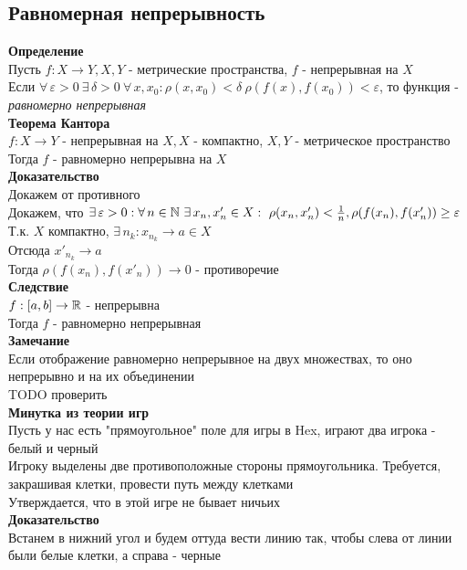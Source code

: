 \documentclass[12pt]{article}
\begin{document}
\subsection{Равномерная непрерывность}
\textbf{Определение}\\
Пусть $f: X \rightarrow Y, X, Y$ - метрические пространства, $f$ - непрерывная на $X$\\
Если $\forall\,\varepsilon > 0\ \exists\,\delta > 0\ \forall\,x,x_0: \rho(x, x_0) < \delta\ \rho(f(x), f(x_0)) < \varepsilon$, то функция - \textit{равномерно непрерывная}\\
\textbf{Теорема Кантора}\\
$f: X \rightarrow Y$ - непрерывная на $X, X$ - компактно, $X, Y$ - метрическое пространство\\
Тогда $f$ - равномерно непрерывна на $X$\\
\textbf{Доказательство}\\
Докажем от противного\\
Докажем, что $\exists\,\varepsilon > 0: \forall\,n \in \mathbb{N}\ \exists\,x_n, x'_n \in X:\ \rho(x_n, x'_n) < \frac{1}{n}, \rho(f(x_n), f(x'_n)) \geq \varepsilon$\\
Т.к. $X$ компактно, $\exists\,n_k: x_{n_k} \rightarrow a \in X$\\
Отсюда $x'_{n_k} \rightarrow a$\\
Тогда $\rho(f(x_n), f(x'_n)) \rightarrow 0$ - противоречие\\
\textbf{Следствие}\\
$f:[a,b]\rightarrow \mathbb{R}$ - непрерывна\\
Тогда $f$ - равномерно непрерывная\\
\textbf{Замечание}\\
Если отображение равномерно непрерывное на двух множествах, то оно непрерывно и на их объединении\\
TODO проверить\\
\textbf{Минутка из теории игр}\\
Пусть у нас есть "прямоугольное" поле для игры в Hex, играют два игрока - белый и черный\\
Игроку выделены две противоположные стороны прямоугольника. Требуется, закрашивая клетки, провести путь между клетками\\
Утверждается, что в этой игре не бывает ничьих\\
\textbf{Доказательство}\\
Встанем в нижний угол и будем оттуда вести линию так, чтобы слева от линии были белые клетки, а справа - черные\\
\end{document}

